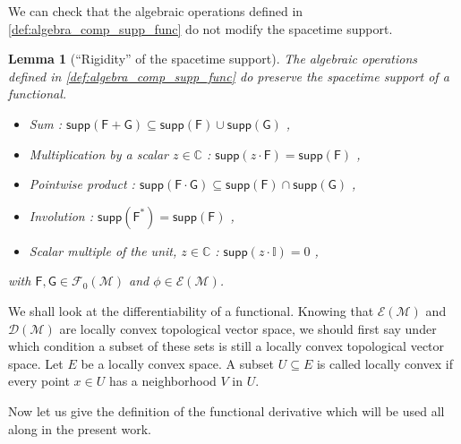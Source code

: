 \documentclass[10pt]{book}
\newcommand{\supp}{\mathsf{supp}}
\newcommand{\Dcal}{\mathcal{D}}
\newcommand{\Ecal}{\mathcal{E}}
\newcommand{\Fcal}{\mathcal{F}}
\newcommand{\Mcal}{\mathcal{M}}
\newcommand{\Cbb}{\mathbb{C}}
\newcommand{\Ibb}{\mathbb{I}}
\newcommand{\Fsf}{\mathsf{F}}
\newcommand{\Gsf}{\mathsf{G}}
\theoremstyle{break}
\newtheorem{lemma}{Lemma}
\begin{document}
We can check that the algebraic operations defined in \ref{def:algebra_comp_supp_func} do not modify the spacetime support.


\begin{lemma}[``Rigidity'' of the spacetime support]
The algebraic operations defined in \ref{def:algebra_comp_supp_func} do preserve the spacetime support of a functional. 
%
\begin{itemize}
\item Sum : $\supp(\Fsf + \Gsf) \subseteq \supp(\Fsf) \cup \supp(\Gsf)$ ,
\item Multiplication by a scalar $z\in\Cbb$ : $\supp(z\cdot\Fsf) = \supp(\Fsf)$ ,
\item Pointwise product : $\supp(\Fsf \cdot \Gsf) \subseteq \supp(\Fsf) \cap \supp(\Gsf)$ ,
\item Involution : $\supp(\Fsf^\ast) = \supp(\Fsf)$ ,
\item Scalar multiple of the unit, $z\in\Cbb$ : $\supp(z\cdot\Ibb) = 0 $ ,
\end{itemize}
%
with $\Fsf, \Gsf \in \Fcal_0(\Mcal)$ and $\phi \in \Ecal(\Mcal)$.
\end{lemma}


We shall look at the differentiability of a functional. Knowing that $\Ecal(\Mcal)$ and $\Dcal(\Mcal)$ are locally convex topological vector space, we should first say under which condition a subset of these sets is still a locally convex topological vector space. Let $E$ be a locally convex space. A subset $U \subseteq E$ is called locally convex if every point $x \in U$ has a neighborhood $V$ in $U$. 


\bigskip


Now let us give the definition of the functional derivative which will be used all along in the present work.
\end{document}
